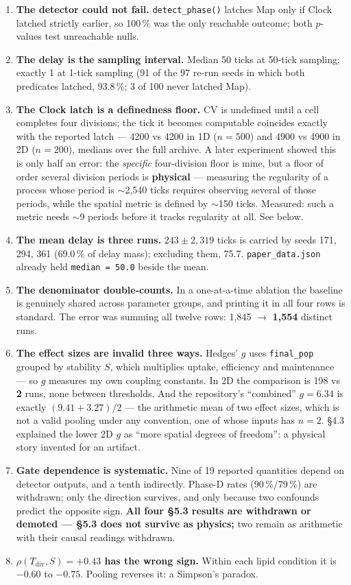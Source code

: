 \documentclass[11pt,letterpaper]{article}
\begin{document}
\begin{enumerate}
\item \textbf{The detector could not fail.} \texttt{detect\_phase()}
  latches Map only if Clock latched strictly earlier, so 100\,\% was the
  only reachable outcome; both $p$-values test unreachable nulls.
\item \textbf{The delay is the sampling interval.} Median 50 ticks at
  50-tick sampling; exactly 1 at 1-tick sampling (91 of the 97 re-run
  seeds in which both predicates latched, 93.8\,\%; 3 of 100 never
  latched Map).
\item \textbf{The Clock latch is a definedness floor.} CV is undefined
  until a cell completes four divisions; the tick it becomes computable
  coincides exactly with the reported latch --- 4200 vs 4200 in 1D
  ($n = 500$) and 4900 vs 4900 in 2D ($n = 200$), medians over the full
  archive. A later experiment showed this is only half an error: the
  \emph{specific} four-division floor is mine, but a floor of order
  several division periods is \textbf{physical} --- measuring the
  regularity of a process whose period is $\sim$2{,}540 ticks requires
  observing several of those periods, while the spatial metric is
  defined by $\sim$150 ticks. Measured: such a metric needs $\sim$9
  periods before it tracks regularity at all. See below.
\item \textbf{The mean delay is three runs.} $243 \pm 2{,}319$ ticks is
  carried by seeds 171, 294, 361 (69.0\,\% of delay mass); excluding
  them, 75.7. \texttt{paper\_data.json} already held
  \texttt{median = 50.0} beside the mean.
\item \textbf{The denominator double-counts.} In a one-at-a-time
  ablation the baseline is genuinely shared across parameter groups, and
  printing it in all four rows is standard. The error was summing all
  twelve rows: 1{,}845 $\rightarrow$ \textbf{1{,}554} distinct runs.
\item \textbf{The effect sizes are invalid three ways.} Hedges' $g$ uses
  \texttt{final\_pop} grouped by stability $S$, which multiplies uptake,
  efficiency and maintenance --- so $g$ measures my own coupling
  constants. In 2D the comparison is 198 vs \textbf{2} runs, none
  between thresholds. And the repository's ``combined'' $g = 6.34$ is
  exactly $(9.41 + 3.27)/2$ --- the arithmetic mean of two effect sizes,
  which is not a valid pooling under any convention, one of whose inputs
  has $n = 2$. \S4.3 explained the lower 2D $g$ as ``more spatial
  degrees of freedom'': a physical story invented for an artifact.
\item \textbf{Gate dependence is systematic.} Nine of 19 reported
  quantities depend on detector outputs, and a tenth indirectly.
  Phase-D rates (90\,\%/79\,\%) are withdrawn; only the direction
  survives, and only because two confounds predict the opposite sign.
  \textbf{All four \S5.3 results are withdrawn or demoted --- \S5.3 does
  not survive as physics;} two remain as arithmetic with their causal
  readings withdrawn.
\item \textbf{$\rho(T_{\mathrm{div}}, S) = +0.43$ has the wrong sign.}
  Within each lipid condition it is $-0.60$ to $-0.75$. Pooling reverses
  it: a Simpson's paradox.
\end{enumerate}
\end{document}

